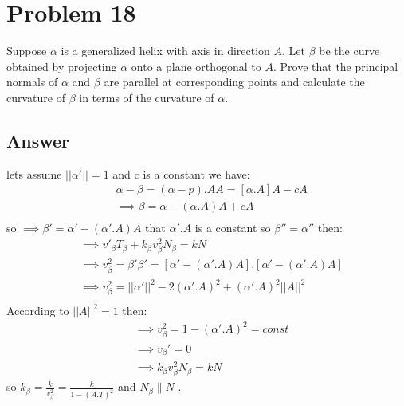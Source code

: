 \documentclass[
	12pt, %
]{fphw}
\theoremstyle{plain}
\begin{document}
\section*{Problem 18}
\begin{problem}
     Suppose $\alpha$ is a generalized helix with axis in direction $A$. Let $\beta$ be the curve obtained by projecting $\alpha$
onto a plane orthogonal to $A$. Prove that the principal normals of $\alpha$ and $\beta$ are parallel at corresponding
points and calculate the curvature of $\beta$ in terms of the curvature of $\alpha$.
\end{problem}
\subsection*{Answer}
lets assume $||\alpha'|| = 1$ and c is a constant we have:\\
\begin{align*}
    &\alpha - \beta = (\alpha - p).AA = [\alpha.A]A - cA\\
    &\implies \beta = \alpha - (\alpha.A)A + cA\\
\end{align*}
so $\implies \beta' = \alpha' - (\alpha'.A)A$ that $\alpha'.A$ is a constant so $\beta'' =\alpha''$ then:\\
\begin{align*}
     &\implies v'_\beta T_\beta + k_\beta v_\beta^2 N_\beta = kN\\
     &\implies v_\beta^2 = \beta'\beta' = [\alpha' - (\alpha'.A)A].[\alpha' - (\alpha'.A)A]\\
     &\implies v_\beta^2 = ||\alpha'||^2 - 2(\alpha'.A)^2 + (\alpha'.A)^2 ||A||^2\\
 \end{align*}
 According to $||A||^2 = 1$ then:\\
 \begin{align*}
     &\implies v_\beta^2 = 1 - (\alpha'.A)^2 = const\\
     &\implies v_\beta' = 0\\
     &\implies k_\beta v_\beta^2 N_\beta = kN
 \end{align*}
 so $k_\beta = \frac{k}{ v_\beta^2} = \frac{k}{ 1 - (A.T)^2}$ and $N_\beta \parallel N$ .
\end{document}
